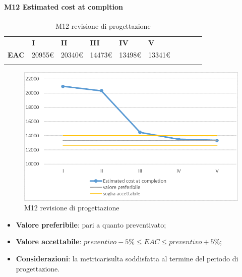 \paragraph{M12 Estimated cost at compltion} \mbox{}
\begin{longtable}[H!] {						
		>{}p{38mm}  		
		>{}p{12mm}
		>{}p{12mm}		
		>{}p{12mm}		
		>{}p{12mm}		
		>{}p{12mm}		
		>{}p{12mm}
		>{}p{12mm}
		>{}p{12mm}
		>{}p{12mm}
	}
	\rowcolor{gray!50}
	\textbf{} & \textbf{I} & \textbf{II} & \textbf{III} & \textbf{IV} & \textbf{V} \TBstrut \\ [2mm]
	\textbf{EAC} & 20955\euro & 20340\euro & 14473\euro & 13498\euro & 13341\euro \TBstrut \\ [2mm]
	\rowcolor{white}
	\caption{M12 revisione di progettazione\glo}
\end{longtable}
\begin{figure}[H] 	
\includegraphics[width=\linewidth]{./img/grafici/RP9.png}	
\caption{M12 revisione di progettazione\glo}	
\end{figure}
\begin{itemize}
	\item \textbf{Valore preferibile}: pari a quanto preventivato;
	\item \textbf{Valore accettabile}: $preventivo-5\% \le EAC \le preventivo+5\%$;
	\item \textbf{Considerazioni}: la metrica\glosp risulta soddisfatta al termine del periodo di progettazione\glo.
\end{itemize}
